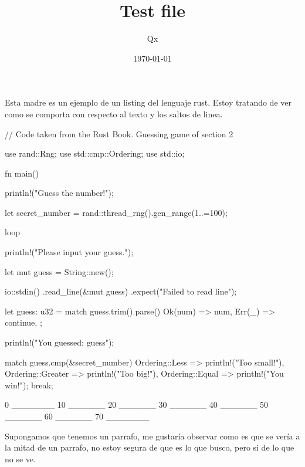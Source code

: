 \documentclass[pagecolor=false, pagesize=a5paper, stretchmode]{qx-files/qx-notes}
\title{Test file}
\author{Qx}
\date{\today}
\begin{document}
  \maketitle

  Esta madre es un ejemplo de un listing del lenguaje rust. Estoy tratando de ver
  como se comporta con respecto al texto y los saltos de linea.


  \begin{codeblock}
    // Code taken from the Rust Book. Guessing game of section 2

    use rand::Rng;
    use std::cmp::Ordering;
    use std::io;

    fn main() {
      println!("Guess the number!");

      let secret_number = rand::thread_rng().gen_range(1..=100);

      loop {
        println!("Please input your guess.");

        let mut guess = String::new();

        io::stdin()
            .read_line(&mut guess)
            .expect("Failed to read line");

        let guess: u32 = match guess.trim().parse() {
          Ok(num) => num,
          Err(_) => continue,
        };

        println!("You guessed: {guess}");

        match guess.cmp(&secret_number) {
          Ordering::Less => println!("Too small!"),
          Ordering::Greater => println!("Too big!"),
          Ordering::Equal => {
            println!("You win!");
            break;
          }
        }
      }
    }
  \end{codeblock}


  \begin{codeblock}
    0 _______ 10 ______ 20 ______ 30 ______ 40 ______ 50 ______ 60 ______ 70 _______
  \end{codeblock}

  Supongamos que tenemos un parrafo, me gustaría observar como es que
   se vería a la mitad de un parrafo, no estoy segura de que es lo que busco, pero si de lo que no se ve.
\end{document}
